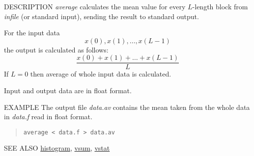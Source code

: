 \begin{synopsis}
\item [average] [ --l $L$ ] [ --n $N$ ] [ {\em infile} ] 
\end{synopsis}

\begin{qsection}{DESCRIPTION}
{\em average} calculates the mean value for every $L$-length block 
from {\em infile} (or standard input),
sending the result to standard output.

For the input data
\begin{displaymath}
  x(0),x(1),\ldots,x(L-1)
\end{displaymath}
the output is calculated as follows:
\begin{displaymath}
\frac{x(0)+x(1)+\ldots+x(L-1)}{L}
\end{displaymath}
If $L=0$ then average of whole input data is calculated.
\par
Input and output data are in float format.
\end{qsection}

\begin{options}
\end{options}

\begin{qsection}{EXAMPLE}
The output file {\em data.av} contains the mean taken from the whole data in
{\em data.f} read in float format.
\begin{quote}
 \verb!average < data.f > data.av!
\end{quote} 
\end{qsection}

\begin{qsection}{SEE ALSO}
\hyperlink{histogram}{histogram},
\hyperlink{vsum}{vsum},
\hyperlink{vstat}{vstat}
\end{qsection}
